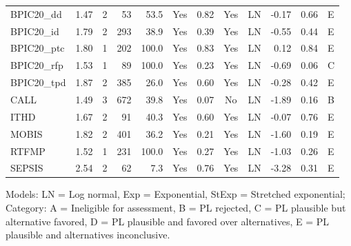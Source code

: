 {\begin{tabular}{lrrrrcrclrrl}
BPIC20\_dd & 1.47 & 2 & 53 & 53.5 & Yes & 0.82 & Yes & LN & -0.17 & 0.66 & \cellcolor[HTML]{19C8C8} E \\
BPIC20\_id & 1.79 & 2 & 293 & 38.9 & Yes & 0.39 & Yes & LN & -0.55 & 0.44 & \cellcolor[HTML]{19C8C8} E \\
BPIC20\_ptc & 1.80 & 1 & 202 & 100.0 & Yes & 0.83 & Yes & LN & 0.12 & 0.84 & \cellcolor[HTML]{19C8C8} E \\
BPIC20\_rfp & 1.53 & 1 & 89 & 100.0 & Yes & 0.23 & Yes & LN & -0.69 & 0.06 & \cellcolor[HTML]{9670BD} C \\
BPIC20\_tpd & 1.87 & 2 & 385 & 26.0 & Yes & 0.60 & Yes & LN & -0.28 & 0.42 & \cellcolor[HTML]{19C8C8} E \\
CALL & 1.49 & 3 & 672 & 39.8 & Yes & 0.07 & No & LN & -1.89 & 0.16 & \cellcolor[HTML]{EA4646} B \\
ITHD & 1.67 & 2 & 91 & 40.3 & Yes & 0.60 & Yes & LN & -0.07 & 0.76 & \cellcolor[HTML]{19C8C8} E \\
MOBIS & 1.82 & 2 & 401 & 36.2 & Yes & 0.21 & Yes & LN & -1.60 & 0.19 & \cellcolor[HTML]{19C8C8} E \\
RTFMP & 1.52 & 1 & 231 & 100.0 & Yes & 0.27 & Yes & LN & -1.03 & 0.26 & \cellcolor[HTML]{19C8C8} E \\
SEPSIS & 2.54 & 2 & 62 & 7.3 & Yes & 0.76 & Yes & LN & -3.28 & 0.31 & \cellcolor[HTML]{19C8C8} E \\
\bottomrule
\end{tabular}
}
\begin{center}\footnotesize
Models: LN = Log normal, Exp = Exponential, StExp = Stretched exponential; \quad Category: A = Ineligible for assessment, B = PL rejected, C = PL plausible but alternative favored, D = PL plausible and favored over alternatives, E = PL plausible and alternatives inconclusive.
\end{center}
